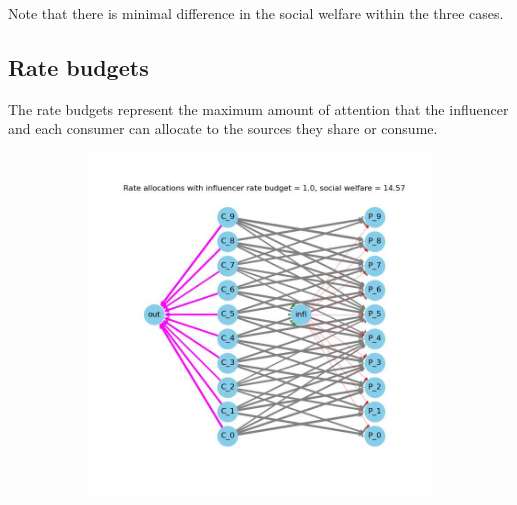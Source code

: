 \documentclass[11pt, letterpaper]{article}
\begin{document}
Note that there is minimal difference in the social welfare within the three cases.

\subsection{Rate budgets}

The rate budgets represent the maximum amount of attention that the influencer and each consumer can allocate to the sources they share or consume. 

\begin{figure}[h]
    \centering
\begin{adjustbox}{max width=1.5\textwidth,center}
    \begin{subfigure}[b]{0.4\textwidth}
        \includegraphics[width=\linewidth]{"figures/M_INFL/1.0_allocs.jpg"}
    \end{subfigure}
    \begin{subfigure}[b]{0.4\textwidth}

\end{subfigure}
\end{adjustbox}
\end{figure}
\end{document}

